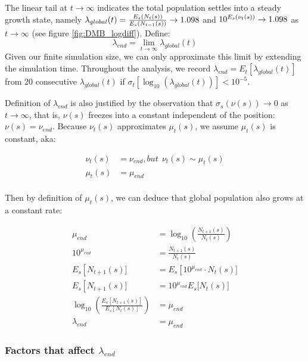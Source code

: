 \documentclass[a4paperpaper,]{article}
\begin{document}
The linear tail at \(t\rightarrow\infty\) indicates the total population
settles into a steady growth state, namely
\(\lambda_{global}(t) = \frac{E_s(N_{t}(s))}{E_s(N_{t-1}(s))} \rightarrow 1.098\)
and \(10^{E_s(\nu_t(s))} \rightarrow 1.098\) as \(t\rightarrow\infty\)
(see figure \ref{fig:DMB_logdiff}). Define: \[
\lambda_{end} = \lim_{t\rightarrow\infty} \lambda_{global}(t)
\] Given our finite simulation size, we can only approximate this limit
by extending the simulation time. Throughout the analysis, we record
\(\lambda_{end} = E_t[\lambda_{global}(t)]\) from 20 consecutive
\(\lambda_{global}(t)\) if
\(\sigma_t[\log_{10}(\lambda_{global}(t))]<10^{-5}\).

Definition of \(\lambda_{end}\) is also justified by the observation
that \(\sigma_s(\nu(s))\rightarrow 0\) as \(t\rightarrow\infty\), that
is, \(\nu(s)\) freezes into a constant independent of the position:
\(\nu(s)=\nu_{end}\). Because \(\nu_t(s)\) approximates \(\mu_t(s)\), we
assume \(\mu_t(s)\) is constant, aka:

\[
\begin{aligned}
  \nu_t(s)  &= \nu_{end}, but ~~
  \nu_t(s) \sim \mu_t(s) \\
  \mu_t(s)  &= \mu_{end} \\
\end{aligned}
\]

Then by definition of \(\mu_t(s)\), we can deduce that global population
also grows at a constant rate:

\[
\begin{aligned}
  \mu_{end} &= \log_{10}( \frac{ N_{t+1}(s) }{N_{t}(s)} ) \\
  10^{\mu_{end}} &= \frac{N_{t+1}(s)}{N_{t}(s)} \\
  E_s \left[ {N_{t+1}(s)} \right.] &= E_s  \left[ {10^{\mu_{end}} \cdot N_t(s)} \right.] \\
  E_s \left[ {N_{t+1}(s)} \right.] &=  {10^{\mu_{end}} E_s[ N_t(s)} ] \\
  \log_{10}\left( \frac{E_s[N_{t+1}(s)]}{E_s[N_t(s)]} \right) &=\mu_{end} \\
  \lambda_{end} &= \mu_{end}
\end{aligned}
\]

\subsubsection{\texorpdfstring{Factors that affect
\(\lambda_{end}\)}{Factors that affect \textbackslash{}lambda\_\{end\}}}\label{factors-that-affect-lambda_end}
\end{document}
